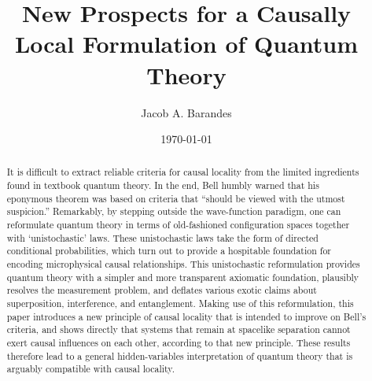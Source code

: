 \documentclass[twoside,twocolumn,english,prl,superscriptaddress,nobibnotes,nofootinbib]{revtex4-2}
\begin{document}
\title{New Prospects for a Causally Local Formulation of Quantum Theory}
\author{Jacob A. Barandes}

\date{\today}
\begin{abstract}
It is difficult to extract reliable criteria for causal locality
from the limited ingredients  found in textbook quantum theory.
In the end, Bell humbly warned that his eponymous theorem was based
on criteria that ``should be viewed with the utmost suspicion.''
Remarkably, by stepping outside the wave-function paradigm, one can
reformulate quantum theory in terms of old-fashioned configuration
spaces together with \textquoteleft unistochastic\textquoteright{}
 laws. These unistochastic laws take the form of directed conditional
probabilities, which turn out to provide a hospitable foundation for
encoding microphysical causal relationships. This unistochastic reformulation
provides quantum theory with a simpler and more transparent axiomatic
 foundation, plausibly resolves the measurement problem, and deflates
various exotic claims about superposition, interference, and entanglement.
Making use of this reformulation, this paper introduces a new principle
of causal locality that is intended to improve on Bell's criteria,
and shows directly that systems that remain at spacelike separation
cannot exert causal influences on each other, according to that new
principle. These results therefore lead to a general hidden-variables
interpretation of quantum theory that is arguably compatible with
causal locality.
\end{abstract}
\maketitle
\end{document}
